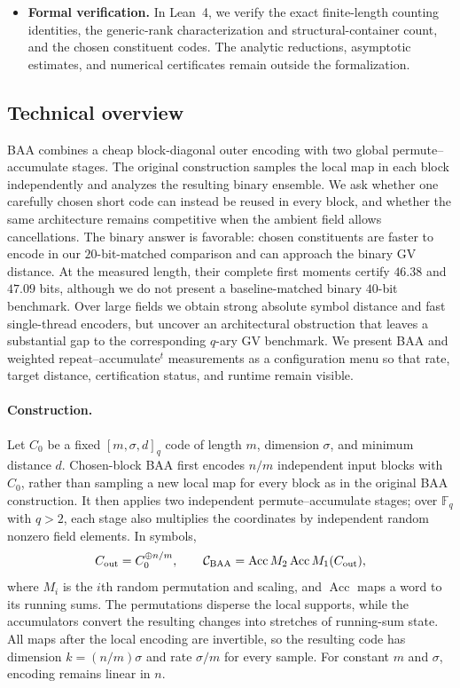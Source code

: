 \documentclass[runningheads,envcountsame,envcountsect]{llncs}
\newcommand{\F}{\mathbb F}
\newcommand{\Acc}{\operatorname{Acc}}
\newcommand{\cC}{\mathcal C}
\begin{document}
\begin{itemize}
    \item \textbf{Formal verification.}
    In Lean~4, we verify the exact finite-length counting identities,
    the generic-rank characterization and structural-container count,
    and the chosen constituent codes.  The analytic reductions, asymptotic
    estimates, and numerical certificates remain outside the formalization.
\end{itemize}

\subsection{Technical overview}

BAA combines a cheap block-diagonal outer encoding with two global
permute--accumulate stages.  The original construction samples the local map in
each block independently and analyzes the resulting binary ensemble.  We ask
whether one carefully chosen short code can instead be reused in every block,
 and whether the same architecture remains competitive when the ambient field
 allows cancellations.  The binary answer is favorable: chosen constituents are
 faster to encode in our $20$-bit-matched comparison and can approach the binary
 GV distance.  At the measured length, their complete first moments certify
 $46.38$ and $47.09$ bits, although we do not present a baseline-matched binary
 $40$-bit benchmark.
 Over large fields we obtain strong absolute symbol distance and fast
 single-thread encoders, but uncover an architectural obstruction that leaves a
 substantial gap to the corresponding $q$-ary GV benchmark.  We present BAA
 and weighted repeat--accumulate$^t$ measurements as a configuration menu so
 that rate, target distance, certification status, and runtime remain visible.

\paragraph{Construction.}
Let $C_0$ be a fixed $[m,\sigma,d]_q$ code of length $m$, dimension
$\sigma$, and minimum distance $d$.  Chosen-block BAA first encodes
$n/m$ independent input blocks with $C_0$, rather than sampling a new local map
for every block as in the original BAA construction.  It then applies two independent
permute--accumulate stages; over $\F_q$ with $q>2$, each stage also multiplies
the coordinates by independent random nonzero field elements.  In symbols,
\[
    C_{\rm out}=C_0^{\oplus n/m},
    \qquad
    \cC_{\rm BAA}=\Acc M_2\Acc M_1(C_{\rm out}),
\]
where $M_i$ is the $i$th random permutation and scaling, and $\Acc$ maps a word
to its running sums.  The permutations disperse the local supports, while the
accumulators convert the resulting changes into stretches of running-sum state.
All maps after the local encoding are invertible, so the
resulting code has dimension $k=(n/m)\sigma$ and rate $\sigma/m$ for every
sample.  For constant $m$ and $\sigma$, encoding remains linear in $n$.
\end{document}
